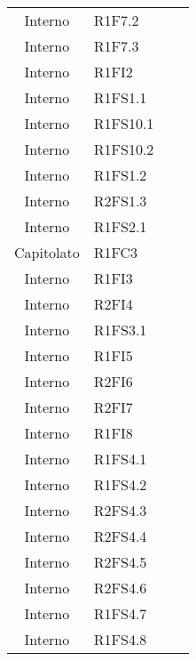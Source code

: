 {\begin{longtable}{ c C{4cm} c c}
Interno & R1F7.2\\

Interno & R1F7.3\\

Interno & R1FI2\\

Interno & R1FS1.1\\

Interno & R1FS10.1\\


Interno & R1FS10.2\\

Interno & R1FS1.2\\

Interno & R2FS1.3\\

Interno & R1FS2.1\\

Capitolato & R1FC3\\

Interno & R1FI3\\

Interno & R2FI4\\

Interno & R1FS3.1\\

Interno & R1FI5\\

Interno & R2FI6\\

Interno & R2FI7\\


Interno & R1FI8\\

Interno & R1FS4.1\\

Interno & R1FS4.2\\

Interno & R2FS4.3\\

Interno & R2FS4.4\\

Interno & R2FS4.5\\

Interno & R2FS4.6\\

Interno & R1FS4.7\\

Interno & R1FS4.8\\


\end{longtable}}
